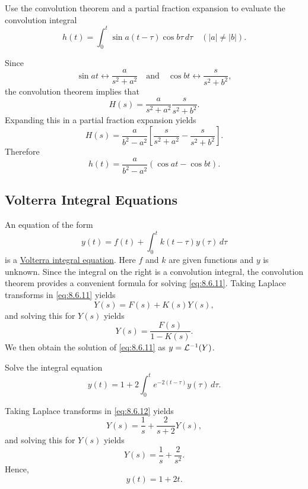 \documentclass{ximera}
\begin{document}
\begin{example}\label{example:8.6.6}
Use the convolution theorem and a partial fraction expansion to
evaluate the convolution integral
$$
h(t)=\int_0^t\sin a(t-\tau)\cos b\tau\,d\tau\quad (|a|\neq |b|).
$$
\begin{explanation}
Since
$$
\sin at\leftrightarrow \frac{a}{s^2+a^2}\quad\mbox{and}\quad
\cos bt\leftrightarrow \frac{s}{s^2+b^2},
$$
 the convolution theorem implies that
$$
H(s)=\frac{a}{s^2+a^2}\frac{s}{s^2+b^2}.
$$
Expanding this in a partial fraction expansion yields
$$
H(s)=\frac{a}{b^2-a^2}\left[\frac{s}{s^2+a^2}-\frac{s}{s^2+b^2}\right].
$$
Therefore
$$
h(t)=\frac{a}{b^2-a^2}\left(\cos at-\cos bt\right).
$$
\end{explanation}
\end{example}

\subsection*{Volterra Integral Equations}

An equation of the form
\begin{equation}\label{eq:8.6.11}
y(t)=f(t)+\int_0^t k(t-\tau) y(\tau)\,d\tau
\end{equation}
is a
\href{http://www-history.mcs.st-and.ac.uk/Mathematicians/Volterra.html}{Volterra integral equation}.
Here $f$ and $k$ are given functions and $y$ is unknown. Since the
integral on the right is a convolution integral, the convolution
theorem provides a convenient formula for solving \eqref{eq:8.6.11}.
Taking Laplace transforms in \eqref{eq:8.6.11} yields
$$
Y(s)=F(s)+K(s) Y(s),
$$
and solving this for $Y(s)$ yields
$$
Y(s)=\frac{F(s)}{1-K(s)}.
$$
We  then obtain the solution of  \eqref{eq:8.6.11} as
 $y={\cal L}^{-1}(Y)$.

\begin{example}\label{example:8.6.7}
 Solve the integral equation
\begin{equation}\label{eq:8.6.12}
y(t)=1+2\int_0^t e^{-2(t-\tau)} y(\tau)\,d\tau.
\end{equation}

\begin{explanation} Taking Laplace transforms in \eqref{eq:8.6.12} yields
$$
Y(s)=\frac{1}{s}+\frac{2}{s+2} Y(s),
$$
and solving this for $Y(s)$ yields
$$
Y(s)=\frac{1}{s}+\frac{2}{s^2}.
$$
Hence,
$$
y(t)=1+2t.
$$
\end{explanation}
\end{example}
\end{document}
